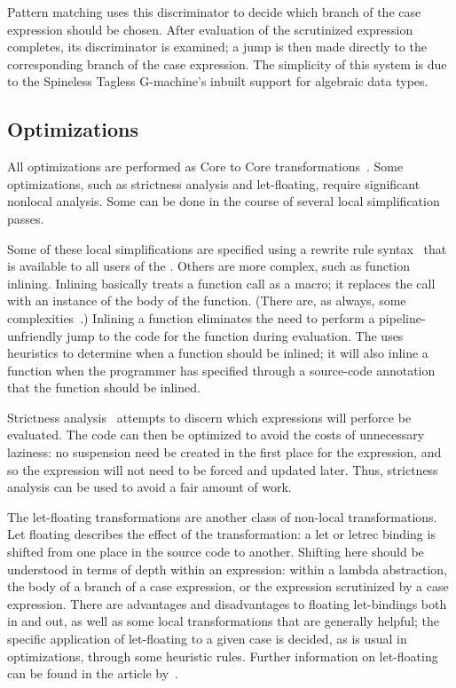 Pattern matching uses this discriminator to decide which branch of the case expression should be chosen. After evaluation of the scrutinized expression completes, its discriminator is examined; a jump is then made directly to the corresponding branch of the case expression. The simplicity of this system is due to the Spineless Tagless G-machine's inbuilt support for algebraic data types.

\subsection{Optimizations}
All optimizations are performed as Core to Core transformations~\citep{Peyton-Jones:A-transformation-based:1998}. Some optimizations, such as strictness analysis and let-floating, require significant nonlocal analysis. Some can be done in the course of several local simplification passes.

Some of these local simplifications are specified using a rewrite rule syntax~\citep{Peyton-Jones:Playing:2001} that is available to all users of the \GHC[long]{}. Others are more complex, such as function inlining. Inlining basically treats a function call as a macro; it replaces the call with an instance of the body of the function. (There are, as always, some complexities~\citep{Peyton-Jones:Secrets:2002}.) Inlining a function eliminates the need to perform a pipeline-unfriendly jump to the code for the function during evaluation. The \GHC[long] uses heuristics to determine when a function should be inlined; it will also inline a function when the programmer has specified through a source-code annotation that the function should be inlined.

Strictness analysis~\citep{Peyton-Jones:Measuring:1993} attempts to discern which expressions will perforce be evaluated. The code can then be optimized to avoid the costs of unnecessary laziness: no suspension need be created in the first place for the expression, and so the expression will not need to be forced and updated later. Thus, strictness analysis can be used to avoid a fair amount of work.

The let-floating transformations are another class of non-local transformations. Let floating describes the effect of the transformation: a let or letrec binding is shifted from one place in the source code to another. Shifting here should be understood in terms of depth within an expression: within a lambda abstraction, the body of a branch of a case expression, or the expression scrutinized by a case expression. There are advantages and disadvantages to floating let-bindings both in and out, as well as some local transformations that are generally helpful; the specific application of let-floating to a given case is decided, as is usual in optimizations, through some heuristic rules. Further information on let-floating can be found in the article by~\citet{Peyton-Jones:Let-floating:1996}.

